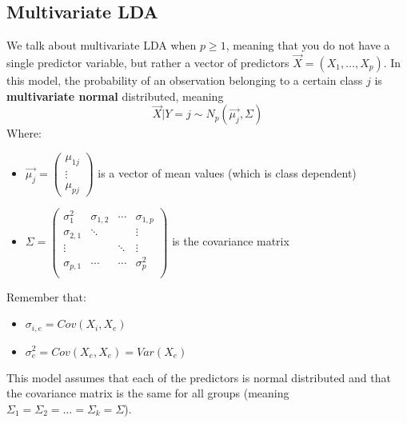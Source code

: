     \subsection{Multivariate LDA}
      We talk about multivariate LDA when $p \geq 1$, meaning that you do not have a single predictor variable, but rather a vector of predictors $\vec{X} = (X_1, \dots, X_p)$.
      In this model, the probability of an observation belonging to a certain class $j$ is \textbf{multivariate normal} distributed, meaning
      $$\vec{X}|Y=j \sim N_p(\vec{\mu_j}, \Sigma)$$
      Where:
      \begin{itemize}
        \item $\vec{\mu_j} = \begin{pmatrix}\mu_{1j}\\\vdots\\\mu_{pj}\end{pmatrix}$ is a vector of mean values (which is class dependent)
        \item $\Sigma = 
        \begin{pmatrix}
        \sigma^2_1   & \sigma_{1,2} & \cdots & \sigma_{1,p}\\
        \sigma_{2,1} & \ddots       &        & \vdots      \\
        \vdots       &              & \ddots & \vdots      \\
        \sigma_{p,1} & \cdots       & \cdots & \sigma_p^{2}\\
        \end{pmatrix}$ is the covariance matrix
      \end{itemize}
      Remember that:
      \begin{itemize}
        \item $\sigma_{i,e}=Cov(X_i,X_e)$ 
        \item $\sigma_{e}^2=Cov(X_e,X_e)=Var(X_e)$
      \end{itemize}
      This model assumes that each of the predictors is normal distributed and that the covariance matrix is the same for all groups (meaning $\Sigma_1=\Sigma_2=\dots=\Sigma_k=\Sigma$).
      

